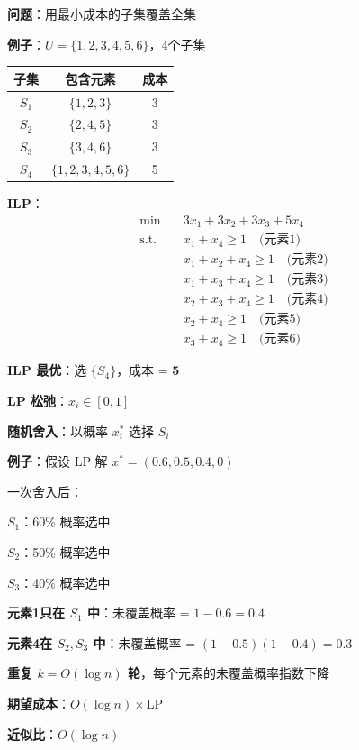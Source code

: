 \documentclass[12pt, a4paper]{ctexart}
\begin{document}
\begin{blackboard}

\textbf{问题}：用最小成本的子集覆盖全集

\textbf{例子}：$U = \{1, 2, 3, 4, 5, 6\}$，4个子集

\begin{center}
\begin{tabular}{c|c|c}
子集 & 包含元素 & 成本 \\
\hline
$S_1$ & $\{1, 2, 3\}$ & 3 \\
$S_2$ & $\{2, 4, 5\}$ & 3 \\
$S_3$ & $\{3, 4, 6\}$ & 3 \\
$S_4$ & $\{1, 2, 3, 4, 5, 6\}$ & 5
\end{tabular}
\end{center}

\textbf{ILP}：
\begin{align*}
\min \quad & 3x_1 + 3x_2 + 3x_3 + 5x_4 \\
\text{s.t.} \quad & x_1 + x_4 \geq 1 \quad \text{(元素1)} \\
& x_1 + x_2 + x_4 \geq 1 \quad \text{(元素2)} \\
& x_1 + x_3 + x_4 \geq 1 \quad \text{(元素3)} \\
& x_2 + x_3 + x_4 \geq 1 \quad \text{(元素4)} \\
& x_2 + x_4 \geq 1 \quad \text{(元素5)} \\
& x_3 + x_4 \geq 1 \quad \text{(元素6)}
\end{align*}

\textbf{ILP 最优}：选 $\{S_4\}$，成本 = \textbf{5}

\end{blackboard}

\begin{blackboard}

\textbf{LP 松弛}：$x_i \in [0, 1]$

\textbf{随机舍入}：以概率 $x_i^*$ 选择 $S_i$

\textbf{例子}：假设 LP 解 $x^* = (0.6, 0.5, 0.4, 0)$

一次舍入后：

$S_1$：60\% 概率选中

$S_2$：50\% 概率选中

$S_3$：40\% 概率选中

\textbf{元素1只在 $S_1$ 中}：未覆盖概率 = $1 - 0.6 = 0.4$

\textbf{元素4在 $S_2, S_3$ 中}：未覆盖概率 = $(1-0.5)(1-0.4) = 0.3$

\textbf{重复 $k = O(\log n)$ 轮}，每个元素的未覆盖概率指数下降

\textbf{期望成本}：$O(\log n) \times \text{LP}$

\textbf{近似比}：$O(\log n)$

\end{blackboard}
\end{document}
